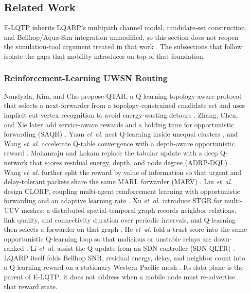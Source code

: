 \subsection{Related Work}
E-LQTP inherits LQARP's multipath channel model, candidate-set
construction, and Bellhop/Aqua-Sim integration unmodified, so this
section does not reopen the simulation-tool argument treated in that
work \cite{liu2026lqarp}.
The subsections that follow isolate the gaps that mobility introduces
on top of that foundation.

\subsubsection{Reinforcement-Learning UWSN Routing}
Nandyala, Kim, and Cho propose QTAR, a Q-learning topology-aware
protocol that selects a next-forwarder from a topology-constrained
candidate set and uses implicit cut-vertex recognition to avoid
energy-wasting detours \cite{nandyala2023qtar}.
Zhang, Chen, and Xie later add service-aware rewards and a holding
time for opportunistic forwarding (SAQR) \cite{zhang2025saqr}.
Yuan \emph{et~al.} nest Q-learning inside unequal clusters
\cite{yuan2023qhier}, and Wang \emph{et~al.} accelerate Q-table
convergence with a depth-aware opportunistic reward
\cite{wang2023rldepth,wang2024qacc}.
Mohanraju and Lokam replace the tabular update with a deep
Q-network that scores residual energy, depth, and node degree
(ADRP-DQL) \cite{mohanraju2025adrp}.
Wang \emph{et~al.} further split the reward by value of information
so that urgent and delay-tolerant packets share the same MARL
forwarder (MARV) \cite{wang2024marv}.
Liu \emph{et~al.} design CLORP, coupling multi-agent reinforcement
learning with opportunistic forwarding and an adaptive learning rate
\cite{liu2024clorP}.
Xu \emph{et~al.} introduce STGR for multi-UUV meshes: a distributed
spatial-temporal graph records neighbor relations, link quality, and
connectivity duration over periodic intervals, and Q-learning then
selects a forwarder on that graph \cite{xu2025stgr}.
He \emph{et~al.} fold a trust score into the same opportunistic
Q-learning loop so that malicious or unstable relays are down-ranked
\cite{he2025trust}.
Li \emph{et~al.} assist the Q-update from an SDN controller
(SDN-QLTR) \cite{li2024sdnqltr}.
LQARP itself folds Bellhop SNR, residual energy, delay, and neighbor
count into a Q-learning reward on a stationary Western Pacific mesh
\cite{liu2026lqarp}.
Its data plane is the parent of E-LQTP; it does not address when a
mobile node must re-advertise that reward state.
